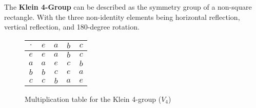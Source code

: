   \begin{example}
    The \textbf{Klein 4-Group} can be described as the symmetry group of a non-square rectangle. With the three non-identity elements being horizontal reflection, vertical reflection, and 180-degree rotation. 

    \begin{figure}[H]
      \centering 
      \begin{tabular}{c|cccc}
        \hline
        $\cdot$ & $e$ & $a$ & $b$ & $c$ \\
        \hline
        $e$ & $e$ & $a$ & $b$ & $c$ \\
        $a$ & $a$ & $e$ & $c$ & $b$ \\
        $b$ & $b$ & $c$ & $e$ & $a$ \\
        $c$ & $c$ & $b$ & $a$ & $e$ \\
        \hline
      \end{tabular}
      \caption{Multiplication table for the Klein 4-group ($V_4$)} 
      \label{fig:klein4group}
    \end{figure}
  \end{example}

